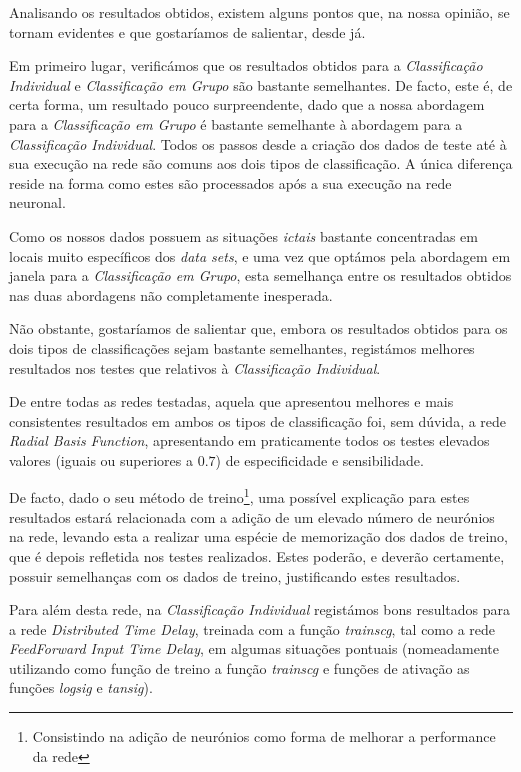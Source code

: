 \documentclass{article}
\begin{document}
Analisando os resultados obtidos, existem alguns pontos que, na nossa opinião, se tornam evidentes e que gostaríamos de salientar, desde já.

Em primeiro lugar, verificámos que os resultados obtidos para a \emph{Classificação Individual} e \emph{Classificação em Grupo} são bastante semelhantes. De facto, este é, de certa forma, um resultado pouco surpreendente, dado que a nossa abordagem para a \emph{Classificação em Grupo} é bastante semelhante à abordagem para a \emph{Classificação Individual}. Todos os passos desde a criação dos dados de teste até à sua execução na rede são comuns aos dois tipos de classificação. A única diferença reside na forma como estes são processados após a sua execução na rede neuronal.

Como os nossos dados possuem as situações \emph{ictais} bastante concentradas em locais muito específicos dos \emph{data sets}, e uma vez que optámos pela abordagem em janela para a \emph{Classificação em Grupo}, esta semelhança entre os resultados obtidos nas duas abordagens não completamente inesperada.

Não obstante, gostaríamos de salientar que, embora os resultados obtidos para os dois tipos de classificações sejam bastante semelhantes, registámos melhores resultados nos testes que relativos à \emph{Classificação Individual}.

De entre todas as redes testadas, aquela que apresentou melhores e mais consistentes resultados em ambos os tipos de classificação foi, sem dúvida, a rede \emph{Radial Basis Function}, apresentando em praticamente todos os testes elevados valores (iguais ou superiores a $0.7$) de especificidade e sensibilidade.

De facto, dado o seu método de treino\footnote{Consistindo na adição de neurónios como forma de melhorar a performance da rede}, uma possível explicação para estes resultados estará relacionada com a adição de um elevado número de neurónios na rede, levando esta a realizar uma espécie de memorização dos dados de treino, que é depois refletida nos testes realizados. Estes poderão, e deverão certamente, possuir semelhanças com os dados de treino, justificando estes resultados.

Para além desta rede, na \emph{Classificação Individual} registámos bons resultados para a rede \emph{Distributed Time Delay}, treinada com a função \emph{trainscg}, tal como a rede \emph{FeedForward Input Time Delay}, em algumas situações pontuais (nomeadamente utilizando como função de treino a função \emph{trainscg} e funções de ativação as funções \emph{logsig} e \emph{tansig}).
\end{document}
